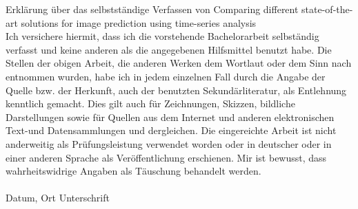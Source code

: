 Erklärung über das selbstständige Verfassen von \glqq Comparing different state-of-the-art solutions for image prediction using time-series analysis\grqq\\
Ich versichere hiermit, dass ich die vorstehende Bachelorarbeit selbständig verfasst und keine anderen als die angegebenen Hilfsmittel benutzt habe. Die Stellen der obigen Arbeit, die anderen Werken dem Wortlaut oder dem Sinn nach entnommen wurden, habe ich in jedem einzelnen Fall durch die Angabe der Quelle bzw. der Herkunft, auch der benutzten Sekundärliteratur, als Entlehnung kenntlich gemacht. Dies gilt auch für Zeichnungen, Skizzen, bildliche Darstellungen sowie für Quellen aus dem Internet und anderen elektronischen Text-und Datensammlungen und dergleichen. Die eingereichte Arbeit ist nicht anderweitig als Prüfungsleistung verwendet worden oder in deutscher oder in einer anderen Sprache als Veröffentlichung erschienen. Mir ist bewusst, dass wahrheitswidrige Angaben als Täuschung behandelt werden.\\\\
Datum, Ort Unterschrift\\